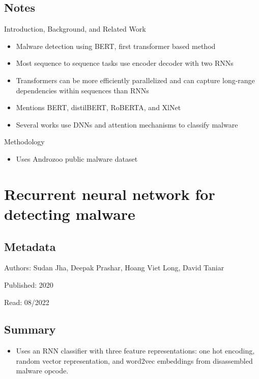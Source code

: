 \documentclass{article}
\begin{document}
\subsection*{Notes}

Introduction, Background, and Related Work
\begin{itemize}
\item Malware detection using BERT, first transformer based method
\item Most sequence to sequence tasks use encoder decoder with two RNNs
\item Transformers can be more efficiently parallelized and can capture long-range dependencies within sequences than RNNs
\item Mentions BERT, distilBERT, RoBERTA, and XlNet
\item Several works use DNNs and attention mechanisms to classify malware
\end{itemize}
Methodology
\begin{itemize}
\item Uses Androzoo public malware dataset
\end{itemize}

\pagebreak


\section*{Recurrent neural network for detecting malware}

\subsection*{Metadata}

\noindent Authors: Sudan Jha, Deepak Prashar, Hoang Viet Long, David Taniar

\noindent Published: 2020

\noindent Read: 08/2022

\subsection*{Summary}
\begin{itemize}
\item Uses an RNN classifier with three feature representations: one hot encoding, random vector representation, and word2vec embeddings from disassembled malware opcode.
\end{itemize}
\end{document}

